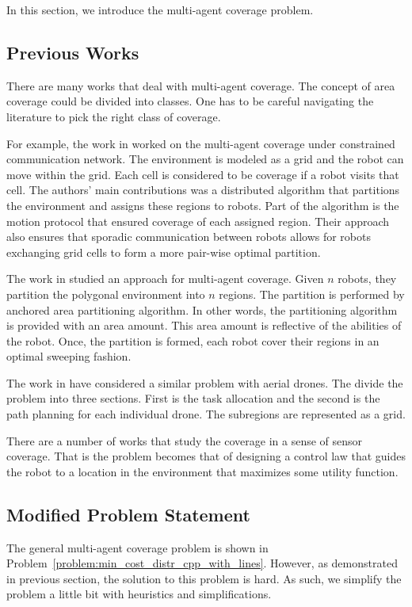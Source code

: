 \documentclass[../main.tex]{subfiles}
\begin{document}
In this section, we introduce the multi-agent coverage problem.

\subsection{Previous Works}
\label{sec:multi-agent_previous_works}
There are many works that deal with multi-agent coverage. The concept of area coverage could be divided into classes. One has to be careful navigating the literature to pick the right class of coverage.

For example, the work in\cite{durham2012discrete} worked on the multi-agent coverage under constrained communication network. The environment is modeled as a grid and the robot can move within the grid. Each cell is considered to be coverage if a robot visits that cell. The authors' main contributions was a distributed algorithm that partitions the environment and assigns these regions to robots. Part of the algorithm is the motion protocol that ensured coverage of each assigned region. Their approach also ensures that sporadic communication between robots allows for robots exchanging grid cells to form a more pair-wise optimal partition.

The work in \cite{maza2007multiple} studied an approach for multi-agent coverage. Given $n$ robots, they partition the polygonal environment into $n$ regions. The partition is performed by anchored area partitioning algorithm. In other words, the partitioning algorithm is provided with an area amount. This area amount is reflective of the abilities of the robot. Once, the partition is formed, each robot cover their regions in an optimal sweeping fashion.

The work in \cite{barrientos2011aerial} have considered a similar problem with aerial drones. The divide the problem into three sections. First is the task allocation and the second is the path planning for each individual drone. The subregions are represented as a grid.

There are a number of works that study the coverage in a sense of sensor coverage. That is the problem becomes that of designing a control law that guides the robot to a location in the environment that maximizes some utility function\cite{}. 


\subsection{Modified Problem Statement}
The general multi-agent coverage problem is shown in Problem~\ref{problem:min_cost_distr_cpp_with_lines}. However, as demonstrated in previous section, the solution to this problem is hard. As such, we simplify the problem a little bit with heuristics and simplifications.
\end{document}
